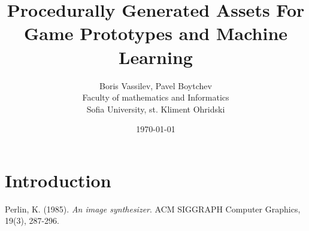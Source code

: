 \documentclass[12pt]{article}
\title{Procedurally Generated Assets For Game Prototypes and Machine Learning}
\author{Boris Vassilev, Pavel Boytchev\\
        Faculty of mathematics and Informatics \\
        Sofia University, st. Kliment Ohridski}
\date{\today}
\begin{document}
\maketitle

\begin{abstract}


\end{abstract}

\section{Introduction}


\begin{thebibliography}{99}
     Perlin, K. (1985). \textit{An image synthesizer}. ACM SIGGRAPH Computer Graphics, 19(3), 287-296.
\end{thebibliography}
\end{document}

